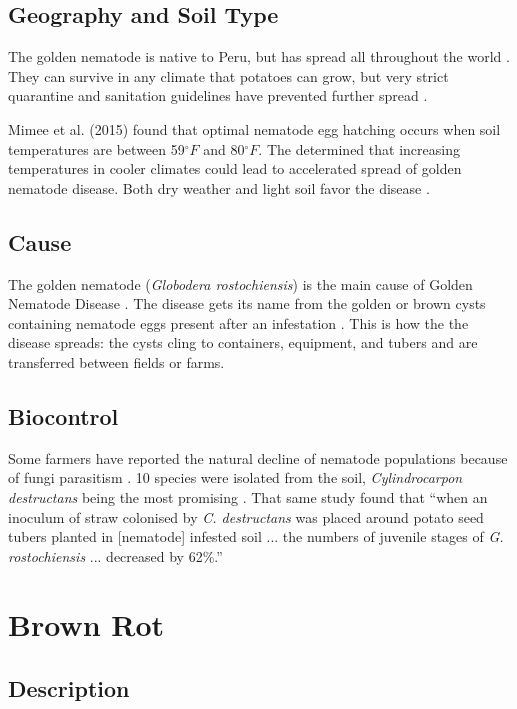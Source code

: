 \documentclass[letterpaper, 12pt]{report}
\begin{document}
\subsection{Geography and Soil Type}

The golden nematode is native to Peru, but has spread all throughout the world \autocite{rich2013potato}. They can survive in any climate that potatoes can grow, but very strict quarantine and sanitation guidelines have prevented further spread \autocite{evans1980origin}.

Mimee et al. (2015) found that optimal nematode egg hatching occurs when soil temperatures are between 59$^\circ F$ and 80$^\circ F$. The determined that increasing temperatures in cooler climates could lead to accelerated spread of golden nematode disease. Both dry weather and light soil favor the disease \autocite{rich2013potato}.

\subsection{Cause}

The golden nematode (\emph{Globodera rostochiensis}) is the main cause of Golden Nematode Disease \autocite{rich2013potato}. The disease gets its name from the golden or brown cysts containing nematode eggs present after an infestation \autocite{rich2013potato}. This is how the the disease spreads: the cysts cling to containers, equipment, and tubers and are transferred between fields or farms.

\subsection{Biocontrol}

Some farmers have reported the natural decline of nematode populations because of fungi parasitism \autocite{evans1993reviews}. 10 species were isolated from the soil, \emph{Cylindrocarpon destructans} being the most promising \autocite{evans1993reviews}. That same study found that ``when an inoculum of straw colonised by \emph{C. destructans} was placed around potato seed tubers planted in [nematode] infested soil ... the numbers of juvenile stages of \emph{G. rostochiensis} ... decreased by 62\%.''


\section{Brown Rot}

\subsection{Description}
\end{document}
